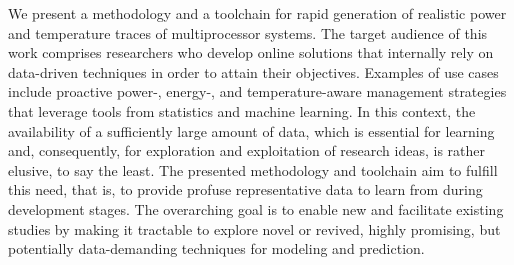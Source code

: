 We present a methodology and a toolchain for rapid generation of realistic power
and temperature traces of multiprocessor systems. The target audience of this
work comprises researchers who develop online solutions that internally rely on
data-driven techniques in order to attain their objectives. Examples of use
cases include proactive power-, \mbox{energy-,} and temperature-aware management
strategies that leverage tools from statistics and machine learning. In this
context, the availability of a sufficiently large amount of data, which is
essential for learning and, consequently, for exploration and exploitation of
research ideas, is rather elusive, to say the least. The presented methodology
and toolchain aim to fulfill this need, that is, to provide profuse
representative data to learn from during development stages. The overarching
goal is to enable new and facilitate existing studies by making it tractable to
explore novel or revived, highly promising, but potentially data-demanding
techniques for modeling and prediction.
